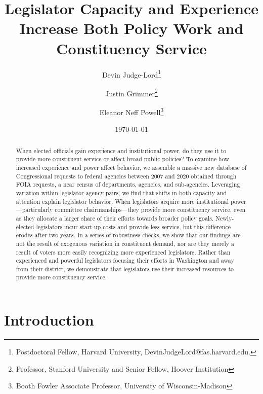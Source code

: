 \documentclass[12pt]{article}
\title{Legislator Capacity and Experience Increase Both Policy Work and Constituency Service}
\author{Devin Judge-Lord\thanks{Postdoctoral Fellow, Harvard University, DevinJudgeLord@fas.harvard.edu.}\and Justin Grimmer\thanks{Professor, Stanford University and Senior Fellow, Hoover Institution} \and Eleanor Neff Powell\thanks{Booth Fowler Associate Professor, University of Wisconsin-Madison}}
\date{\today}
\begin{document}
\maketitle




\begin{abstract}
\noindent 
When elected officials gain experience and institutional power, do they use it to provide more constituent service or affect broad public policies? To examine how increased experience and power affect behavior, we assemble a massive new database of   Congressional requests to federal agencies between 2007 and 2020 obtained through  FOIA requests, a near census of departments, agencies, and sub-agencies. Leveraging variation within legislator-agency pairs, we find that shifts in both capacity and attention explain legislator behavior. When legislators acquire more institutional power---particularly committee chairmanships---they provide more constituency service, even as they allocate a larger share of their efforts towards broader policy goals. Newly-elected legislators incur start-up costs and provide less service, but this difference erodes after two years. In a series of robustness checks, we show that our findings are not the result of exogenous variation in constituent demand, nor are they merely a result of voters more easily recognizing more experienced legislators. Rather than experienced and powerful legislators focusing their efforts in Washington and away from their district, we demonstrate that legislators use their increased resources to provide more constituency service. 
\end{abstract}



%

%

\newpage
\tableofcontents
\doublespacing
\section{Introduction}
\end{document}
